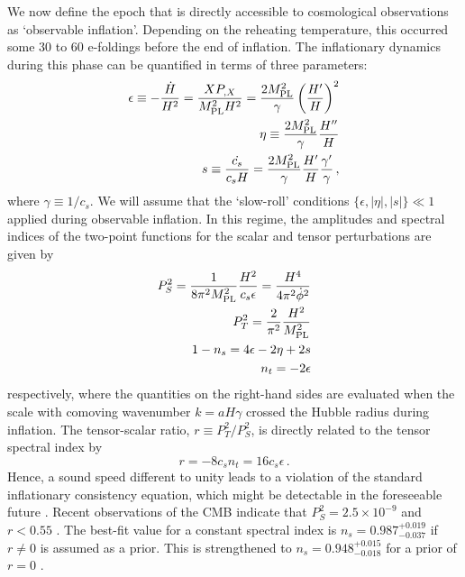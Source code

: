 We now define the epoch that is directly 
accessible to cosmological observations as `observable inflation'. 
Depending on the reheating 
temperature, this occurred some 30 to 60 e-foldings before the end of 
inflation. The inflationary dynamics during this phase can  
be quantified in terms of three parameters: 
\begin{eqnarray}
\label{defepsilon}
\epsilon \equiv -\frac{\dot{H}}{H^2}
= \frac{XP_{,X}}{M_{\mathrm{PL}}^2H^2} 
= \frac{2M_{\mathrm{PL}}^2}{\gamma} \left( \frac{H'}{H} \right)^2 \\
\label{defeta}
\eta \equiv  \frac{2M_{\mathrm{PL}}^2}{\gamma}\frac{H''}{H} \\
\label{defs}
s \equiv \frac{\dot{c_s}}{c_sH} 
= \frac{2M_{\mathrm{PL}}^2}{\gamma} \frac{H'}{H}\frac{\gamma'}{\gamma}  \,,
\end{eqnarray}
where $\gamma \equiv 1/c_s$. 
We will assume that the `slow-roll' conditions 
$\{ \epsilon, |\eta | , |s | \}  \ll 1$ applied during observable inflation. 
In this regime, the amplitudes and spectral indices of the two-point functions 
for the scalar and tensor perturbations are given by \cite{gm}
\begin{eqnarray}
\label{amplitudes}
P_S^2= \frac{1}{8 \pi^2 M_{\mathrm{PL}}^2} \frac{H^2}{c_s \epsilon}
= \frac{H^4}{4\pi^2\dot{\phi}^2}
\\
P_T^2 = \frac{2}{\pi^2} \frac{H^2}{M_{\mathrm{PL}}^2} 
\\
\label{indices}
1-n_s = 4 \epsilon -2\eta  +2s 
\\
 n_t = -2\epsilon  
\end{eqnarray}
respectively, where the quantities on the right-hand sides are evaluated 
when the scale with comoving wavenumber $k=aH\gamma$ crossed 
the Hubble radius during inflation.  
The tensor-scalar ratio, $r \equiv P_T^2/P_S^2$, is directly related to 
the tensor spectral index by \cite{gm}
\begin{equation}
\label{consistency}
r= -8c_sn_t = 16c_s \epsilon\,.
\end{equation}
Hence, a sound speed different to unity leads to a violation of the 
standard inflationary consistency equation, which might be 
detectable in the foreseeable future \cite{lidser1,lidser2}. 
Recent observations of the CMB 
indicate that $P^2_S=2.5 \times 10^{-9}$ and $r < 0.55$ \cite{spergel}. 
The best-fit value for a constant spectral index is 
$n_s = 0.987^{+0.019}_{-0.037}$ if $r\ne 0$ is assumed as a prior. 
This is strengthened to 
$n_s = 0.948^{+0.015}_{-0.018}$ for a prior of $r = 0$ \cite{spergel}. 

